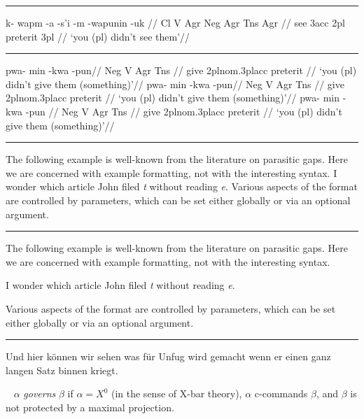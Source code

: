 \filbreak\hrule\medskip

\begingroup
\ex
\begingl
\gla k- wapm -a -s'i -m -wapunin -uk //
\glb Cl V Agr Neg Agr Tns Agr //
 see {\sc 3acc} {} {\sc 2pl} preterit {\sc 3pl} //
\glft `you (pl) didn't see them'//
\endgl
\xe
\endgroup
\bigskip

\filbreak\hrule\medskip

\begingroup
\pex[interpartskip=3ex]
\a
\begingl
\gla pwa- min -kwa -pun//
\glb Neg V Agr Tns //
\glc {} give 2pl{\sc nom}.3pl{\sc acc} preterit //
\glft `you (pl) didn't give them (something)'//
\endgl
\a
\begingl[everygl=\openup.5ex,everygla=,everyglb=,
   everyglft=\it,aboveglftskip=1.5ex]
\gla pwa- min -kwa -pun//
\glb Neg V Agr Tns //
\glc {} give 2pl{\sc nom}.3pl{\sc acc} preterit //
\glft `you (pl) didn't give them (something)'//
\endgl
\a
\begingl[everygl=,everygla=\bf,everyglb=\it,
   everyglft=,aboveglftskip=0pt]
\gla pwa- min -kwa -pun //
\glb Neg V Agr Tns //
\glc {} give 2pl{\sc nom}.3pl{\sc acc} preterit //
\glft `you (pl) didn't give them (something)'//
\endgl
\xe
\endgroup
\bigskip

\filbreak\hrule\medskip

\begingroup
\exdisplay
The following example is well-known from the literature on
parasitic gaps.  Here we are concerned with example formatting,
not with the interesting syntax.
\ex
I wonder which article John filed {\sl t\/} without reading {\sl e}.
\xe
Various aspects of the format are controlled by parameters, which
can be set either globally or via an optional argument.
\xe
\endgroup
\bigskip

\filbreak\hrule\medskip

\begingroup
\exdisplay
The following example is well-known from the literature on
parasitic gaps.  Here we are concerned with example formatting,
not with the interesting syntax.

\ex[numoffset=2em,textoffset=.5em,aboveexskip=1ex,belowexskip=1ex]
I wonder which article John filed {\sl t\/} without reading {\sl e}.
\xe

\noindent Various aspects of the format are controlled by
parameters, which can be set either globally or via an optional
argument.
\xe
\endgroup
\bigskip

\filbreak\hrule\medskip

\begingroup
\ex
Und hier k\"onnen wir sehen was f\"ur Unfug wird gemacht
wenn er einen ganz langen Satz binnen kriegt.\par\nobreak
\xe

\ex~
$\alpha$ {\it governs\/} $\beta$ if $\alpha=X^0$ (in the
sense of X-bar theory), $\alpha$ c-commands $\beta$, and $\beta$
is not protected by a maximal projection.
\xe
\endgroup
\bigskip

